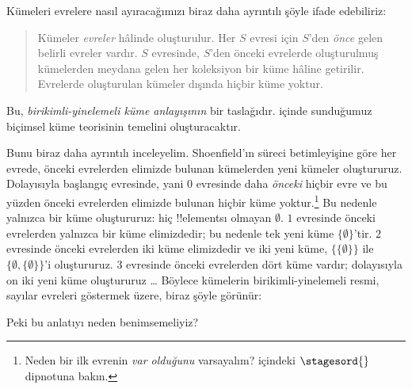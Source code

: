 \documentclass[../../../include/open-logic-section]{subfiles}
\begin{document}

Kümeleri evrelere nasıl ayıracağımızı biraz daha ayrıntılı şöyle ifade
edebiliriz:
\begin{quote}
  Kümeler \emph{evreler} hâlinde oluşturulur. Her $S$ evresi için $S$'den
  \emph{önce} gelen belirli evreler vardır. $S$ evresinde, $S$'den önceki
  evrelerde oluşturulmuş kümelerden meydana gelen her koleksiyon bir küme
  hâline getirilir. Evrelerde oluşturulan kümeler dışında hiçbir küme yoktur.
  \citep[p.~323]{Shoenfield:AST}
\end{quote}
Bu, \emph{birikimli-yinelemeli küme anlayışının} bir taslağıdır.
 içinde sunduğumuz biçimsel küme teorisinin temelini
oluşturacaktır.

Bunu biraz daha ayrıntılı inceleyelim. Shoenfield'ın süreci betimleyişine
göre her evrede, önceki evrelerden elimizde bulunan kümelerden yeni kümeler
oluştururuz. Dolayısıyla başlangıç evresinde, yani $0$ evresinde daha
\emph{önceki} hiçbir evre ve bu yüzden önceki evrelerden elimizde bulunan
hiçbir küme yoktur.\footnote{Neden bir ilk evrenin \emph{var olduğunu}
varsayalım?  içindeki $\stagesord{}$ dipnotuna bakın.}
Bu nedenle yalnızca bir küme oluştururuz: hiç !!{element}s{}ı olmayan
$\emptyset$. $1$ evresinde önceki evrelerden yalnızca bir küme elimizdedir;
bu nedenle tek yeni küme $\{\emptyset\}$'tir. $2$ evresinde önceki evrelerden
iki küme elimizdedir ve iki yeni küme, $\{\{\emptyset\}\}$ ile
$\{\emptyset,\{\emptyset\}\}$'i oluştururuz. $3$ evresinde önceki
evrelerden dört küme vardır; dolayısıyla on iki yeni küme oluştururuz
\ldots{} Böylece kümelerin birikimli-yinelemeli resmi, sayılar evreleri
göstermek üzere, biraz şöyle görünür:
\begin{center}
\end{center}
Peki bu anlatıyı neden benimsemeliyiz?
\end{document}
